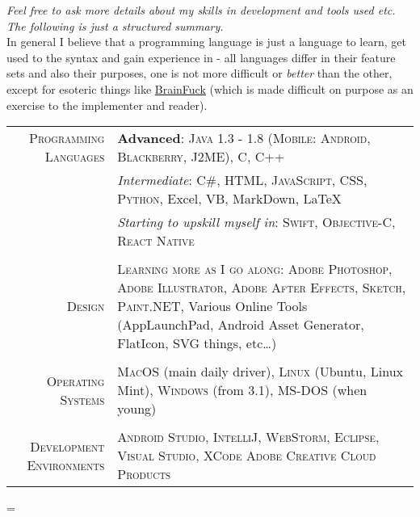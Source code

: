 \documentclass[a4paper,10pt,notitlepage]{article}
\newenvironment{absolutelynopagebreak}
  {\par\nobreak\vfil\penalty0\vfilneg
   \vtop\bgroup}
  {\par\xdef\tpd{\the\prevdepth}\egroup
   \prevdepth=\tpd}
\begin{document}
\begin{absolutelynopagebreak}
	\textit{Feel free to ask more details about my skills in development and tools used etc. The following is just a structured summary.} \\
	
	\footnotesize{In general I believe that a programming language is just a language to learn, get used to the syntax and gain experience in - all languages differ in their feature sets and also their purposes, one is not more difficult or \textit{better} than the other, except for esoteric things like \href{https://en.wikipedia.org/wiki/Brainfuck}{BrainFuck} (which is made difficult on purpose as an exercise to the implementer and reader).} \\
	
	\begin{tabular}{r|p{11cm}}
		
		\textsc{Programming Languages}    & \textbf{Advanced}: \textsc{Java 1.3 - 1.8 (Mobile: Android, Blackberry, J2ME)}, \textsc{C}, \textsc{C++} \\
		                                  & \emph{Intermediate}: \textsc{C\#}, \textsc{HTML}, \textsc{JavaScript}, \textsc{CSS}, \textsc{Python}, Excel, VB, MarkDown, {\fb \LaTeX} \setmainfont[SmallCapsFont=Fontin-SmallCaps.otf]{Fontin.otf} \\
		                                  & \emph{Starting to upskill myself in}: \textsc{Swift}, \textsc{Objective-C}, \textsc{React Native} \\
		                                  
		\multicolumn{2}{c}{}\\
		
		\textsc{Design}                   & \textsc{Learning more as I go along}: \textsc{Adobe Photoshop}, \textsc{Adobe Illustrator}, \textsc{Adobe After Effects}, \textsc{Sketch}, \textsc{Paint.NET}, Various Online Tools (AppLaunchPad, Android Asset Generator, FlatIcon, SVG things, etc\ldots) \\
		
		\multicolumn{2}{c}{}\\
		
		\textsc{Operating Systems}        & \textsc{MacOS} (main daily driver), \textsc{Linux} (Ubuntu, Linux Mint), \textsc{Windows} (from 3.1), \textsc{MS-DOS} (when young) \\
		 
		\multicolumn{2}{c}{} \\
		 
		\textsc{Development Environments} & \textsc{Android Studio}, \textsc{IntelliJ}, \textsc{WebStorm}, \textsc{Eclipse}, \textsc{Visual Studio}, \textsc{XCode} \textsc{Adobe Creative Cloud Products} \\
		 

\end{tabular}
\end{absolutelynopagebreak}
\end{document}

